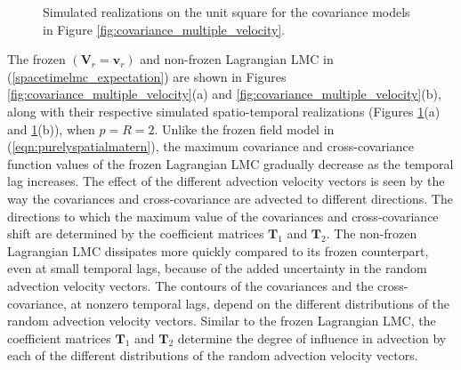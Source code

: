 \documentclass[12pt]{article}
\newcommand{\0}{\mathbf{0}}
\begin{document}
   \begin{figure}[htb!]
 \centering
    \qquad
    \captionsetup[subfloat]{margin=-2cm}
     \caption{Simulated realizations on the unit square for the covariance models in Figure \ref{fig:covariance_multiple_velocity}.}
    \label{fig:covariance_multiple_velocity_realizations}
   \end{figure}
   
The frozen $(\mathbf{V}_r=\mathbf{v}_r)$ and non-frozen Lagrangian LMC in (\ref{spacetimelmc_expectation}) are shown in Figures \ref{fig:covariance_multiple_velocity}(a) and \ref{fig:covariance_multiple_velocity}(b), along with their respective simulated spatio-temporal realizations (Figures \ref{fig:covariance_multiple_velocity_realizations}(a) and \ref{fig:covariance_multiple_velocity_realizations}(b)), when $p=R=2$. Unlike the frozen field model in (\ref{eqn:purelyspatialmatern}), the maximum covariance and  cross-covariance function values of the frozen Lagrangian LMC gradually decrease as the temporal lag increases. The effect of the different advection velocity vectors is seen by the way the covariances and cross-covariance are advected to different directions. The directions to which the maximum value of the covariances and cross-covariance shift are determined by the coefficient matrices $\mathbf{T}_1$ and $\mathbf{T}_2$. The non-frozen Lagrangian LMC dissipates more quickly compared to its frozen counterpart, even at small temporal lags, because of the added uncertainty in the random advection velocity vectors. The contours of the covariances and the cross-covariance, at nonzero temporal lags, depend on the different distributions of the random advection velocity vectors. Similar to the frozen Lagrangian LMC, the coefficient matrices $\mathbf{T}_1$ and $\mathbf{T}_2$ determine the degree of influence in advection by each of the different distributions of the random advection velocity vectors.
\end{document}
